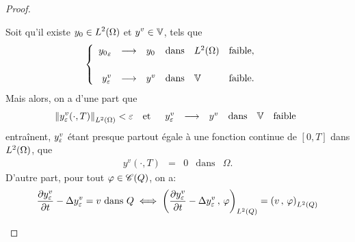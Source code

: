 \begin{proof}
\begin{enumerate}
            Soit qu'il existe $\displaystyle y_{0}\in L^{2}\!\left({\Omega}\right)$ et
            $\displaystyle y^{v}\in \mathbb{V}$, tels que
            \begin{equation*}\label{eq:proof-thm-controllability-44}
                \begin{cases}\displaystyle
                    \begin{array}{rcllll}
                        {y_{0}}_{\varepsilon} & \longrightarrow & y_{0} &
                        \text{dans} & L^{2}\!\left({\Omega}\right) & \text{faible},\\
                        \\
                        y_{\varepsilon}^{v} & \longrightarrow & y^{v} &
                        \text{dans} & \mathbb{V} & \text{faible}.
                    \end{array}
                \end{cases}
            \end{equation*}
            Mais alors, on a d'une part que
            \begin{equation*}\label{eq:proof-thm-controllability-45}
                {\left\|{y_{\varepsilon}^{v}\!\left({\cdot,T}\right) }\right\|}_{L^{2}\left({\Omega}\right)} < \varepsilon
                \quad\text{et}\quad
                \begin{array}{rcllll}
                    y_{\varepsilon}^{v} & \longrightarrow & y^{v} & \text{dans} &
                    \mathbb{V} & \text{faible}
                \end{array}
            \end{equation*}
            entraînent, $y_{\varepsilon}^{v}$ étant presque partout égale à une
            fonction continue de $[0,T]$ dans $L^{2}\!\left({\Omega}\right)$, que
            \begin{equation}\label{eq:proof-thm-controllability-46}
                \begin{array}{rclll}
                    y^{v}\!\left({\cdot, T}\right) & = & 0 & \text{dans} &
                    \Omega.
                \end{array}
            \end{equation}
            D'autre part, pour tout $\varphi\in\mathscr{C}(Q)$, on a:
            \begin{equation*}
                \begin{split}
                    {} & \primetemps{y_{\veps}^{v}} - \Delta y_{\veps}^{v}
                    = v\ \text{dans}\ Q \iff \scalaireq{%
                        \primetemps{y_{\veps}^{v}} - \Delta y_{\veps}^{v}
                    }{\vphi} = \scalaireq{v}{\vphi}\\

\end{split}
\end{equation*}
\end{enumerate}
\end{proof}
